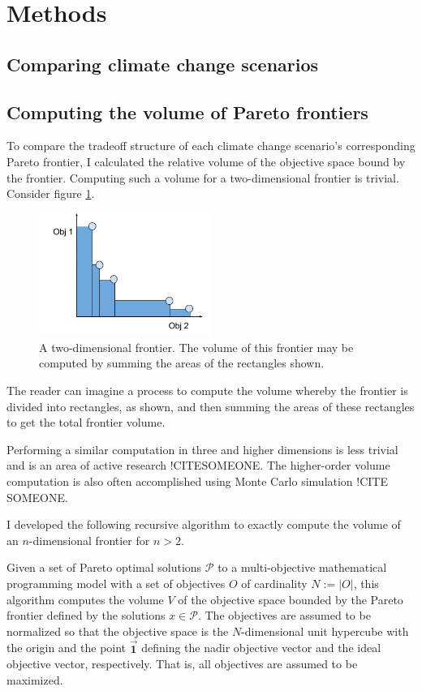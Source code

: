 \section{Methods}
 
\subsection{Comparing climate change scenarios}

\subsection{Computing the volume of Pareto frontiers}
To compare the tradeoff structure of each climate change scenario's corresponding Pareto frontier, I calculated the relative volume of the objective space bound by the frontier.  Computing such a volume for a two-dimensional frontier is trivial. Consider figure \ref{fig:2DFrontierVol}.
\begin{figure}[h]
  \centering
    \includegraphics[width=0.5\textwidth]{"../images/2DFrontierVolumeExample"}
  \caption{A two-dimensional frontier. The volume of this frontier may be computed by summing the areas of the rectangles shown.}
  \label{fig:2DFrontierVol}
\end{figure}
The reader can imagine a process to compute the volume whereby the frontier is divided into rectangles, as shown, and then summing the areas of these rectangles to get the total frontier volume.

Performing a similar computation in three and higher dimensions is less trivial and is an area of active research !CITESOMEONE. The higher-order volume computation is also often accomplished using Monte Carlo simulation !CITE SOMEONE.

I developed the following recursive algorithm to exactly compute the volume of an $n$-dimensional frontier for $n>2$.

Given a set of Pareto optimal solutions $\mathcal{P}$ to a multi-objective mathematical programming model with a set of objectives $O$ of cardinality $N := |O|$, this algorithm computes the volume $V$ of the objective space bounded by the Pareto frontier defined by the solutions $x \in \mathcal{P}$. The objectives are assumed to be normalized so that the objective space is the $N$-dimensional unit hypercube with the origin and the point $\vec{\mathbf{1}}$ defining the nadir objective vector and the ideal objective vector, respectively. That is, all objectives are assumed to be maximized.


